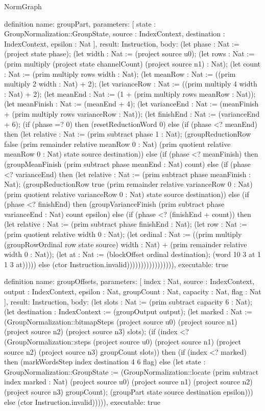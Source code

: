 \begin{lexlean}{NormGraph}
\begin{semanticmodule}
definition{
  name: groupPart,
  parameters: [
    state : GroupNormalization::GroupState,
    source : IndexContext,
    destination : IndexContext,
    epsilon : Nat
  ],
  result: Instruction,
  body: (let phase : Nat := (project state phase); (let width : Nat := (project source u0); (let rows : Nat := (prim multiply (project state channelCount) (project source n1) : Nat); (let count : Nat := (prim multiply rows width : Nat); (let meanRow : Nat := ((prim multiply 2 width : Nat) + 2); (let varianceRow : Nat := ((prim multiply 4 width : Nat) + 2); (let meanEnd : Nat := (1 + (prim multiply rows meanRow : Nat)); (let meanFinish : Nat := (meanEnd + 4); (let varianceEnd : Nat := (meanFinish + (prim multiply rows varianceRow : Nat)); (let finishEnd : Nat := (varianceEnd + 6); (if (phase =? 0) then (resetReductionWord 0) else (if (phase <? meanEnd) then (let relative : Nat := (prim subtract phase 1 : Nat); (groupReductionRow false (prim remainder relative meanRow 0 : Nat) (prim quotient relative meanRow 0 : Nat) state source destination)) else (if (phase <? meanFinish) then (groupMeanFinish (prim subtract phase meanEnd : Nat) count) else (if (phase <? varianceEnd) then (let relative : Nat := (prim subtract phase meanFinish : Nat); (groupReductionRow true (prim remainder relative varianceRow 0 : Nat) (prim quotient relative varianceRow 0 : Nat) state source destination)) else (if (phase <? finishEnd) then (groupVarianceFinish (prim subtract phase varianceEnd : Nat) count epsilon) else (if (phase <? (finishEnd + count)) then (let relative : Nat := (prim subtract phase finishEnd : Nat); (let row : Nat := (prim quotient relative width 0 : Nat); (let ordinal : Nat := ((prim multiply (groupRowOrdinal row state source) width : Nat) + (prim remainder relative width 0 : Nat)); (let at : Nat := (blockOffset ordinal destination); (word 10 3 at 1 1 3 at))))) else (ctor Instruction.invalid))))))))))))))))),
  executable: true
}

definition{
  name: groupOffsets,
  parameters: [
    index : Nat,
    source : IndexContext,
    output : IndexContext,
    epsilon : Nat,
    groupCount : Nat,
    capacity : Nat,
    flag : Nat
  ],
  result: Instruction,
  body: (let slots : Nat := (prim subtract capacity 6 : Nat); (let destination : IndexContext := (groupOutput output); (let marked : Nat := (GroupNormalization::bitmapSteps (project source u0) (project source n1) (project source n2) (project source n3) slots); (if (index <? (GroupNormalization::steps (project source u0) (project source n1) (project source n2) (project source n3) groupCount slots)) then (if (index <? marked) then (markWordsStep index destination 4 6 flag) else (let state : GroupNormalization::GroupState := (GroupNormalization::locate (prim subtract index marked : Nat) (project source u0) (project source n1) (project source n2) (project source n3) groupCount); (groupPart state source destination epsilon))) else (ctor Instruction.invalid))))),
  executable: true
}


\end{semanticmodule}
\end{lexlean}
